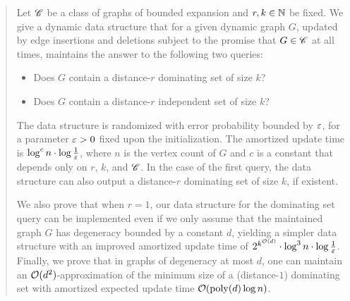 \begin{abstract}
	Let $\Cc$ be a class of graphs of bounded expansion and $r,k\in \N$ be fixed. We give a dynamic data structure that for a given dynamic graph $G$, updated by edge insertions and deletions subject to the promise that $G\in \Cc$ at all times, maintains the answer to the following two queries:
	\begin{itemize}[nosep]
		\item Does $G$ contain a distance-$r$ dominating set of size $k$?
		\item Does $G$ contain a distance-$r$ independent set of size $k$?
	\end{itemize}
	The data structure is randomized with error probability bounded by $\eps$, for a parameter $\eps>0$ fixed upon the initialization. The amortized update time is $\log^c n\cdot \log \frac{1}{\eps}$, where $n$ is the vertex count of $G$ and $c$ is a constant that depends only on $r$, $k$, and $\Cc$. In the case of the first query, the data structure can also output a distance-$r$ dominating set of size $k$, if existent.
	
	We also prove that when $r=1$, our data structure for the dominating set query can be implemented even if we only assume that the maintained graph $G$ has degeneracy bounded by a constant $d$, yielding a simpler data structure with an improved amortized update time of $2^{k^{\Oh(d)}}\cdot \log^3 n\cdot \log \tfrac{1}{\eps}$. Finally, we prove that in graphs of degeneracy at most $d$, one can maintain an $\Oh(d^2)$-approximation of the minimum size of a (distance-$1$) dominating set with amortized expected update time $\Oh(\poly(d) \log n)$.
\end{abstract}